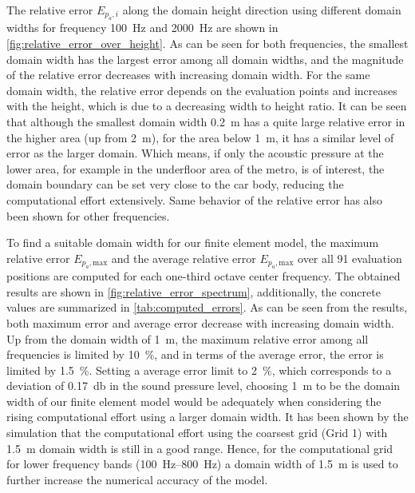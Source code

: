 The relative error $E_{p_a,i}$ along the domain height direction using different domain widths for frequency \SI{100}{\hertz} and \SI{2000}{\hertz} are shown in \cref{fig:relative_error_over_height}. As can be seen for both frequencies, the smallest domain width has the largest error among all domain widths, and the magnitude of the relative error decreases with increasing domain width. For the same domain width, the relative error depends on the evaluation points and increases with the height, which is due to a decreasing width to height ratio. It can be seen that although the smallest domain width \SI{0.2}{\meter} has a quite large relative error in the higher area (up from \SI{2}{\meter}), for the area below \SI{1}{\meter}, it has a similar level of error as the larger domain. Which means, if only the acoustic pressure at the lower area, for example in the underfloor area of the metro, is of interest, the domain boundary can be set very close to the car body, reducing the computational effort extensively. Same behavior of the relative error has also been shown for other frequencies.

To find a suitable domain width for our finite element model, the maximum relative error $E_{p_a,\text{max}}$ and the average relative error $E_{p_a,\text{max}}$ over all 91 evaluation positions are computed for each one-third octave center frequency. The obtained results are shown in \cref{fig:relative_error_spectrum}, additionally, the concrete values are summarized in \cref{tab:computed_errors}. As can be seen from the results, both maximum error and average error decrease with increasing domain width. Up from the domain width of \SI{1}{\meter}, the maximum relative error among all frequencies is limited by \SI{10}{\percent}, and in terms of the average error, the error is limited by \SI{1.5}{\percent}. Setting a average error limit to \SI{2}{\percent}, which corresponds to a deviation of \SI{0.17}{\decibel} in the sound pressure level, choosing \SI{1}{\meter} to be the domain width of our finite element model would be adequately when considering the rising computational effort using a larger domain width. It has been shown by the simulation that the computational effort using the coarsest grid (Grid 1) with \SI{1.5}{\meter} domain width is still in a good range. Hence, for the computational grid for lower frequency bands (\SIrange{100}{800}{\hertz}) a domain width of \SI{1.5}{\meter} is used to further increase the numerical accuracy of the model.

